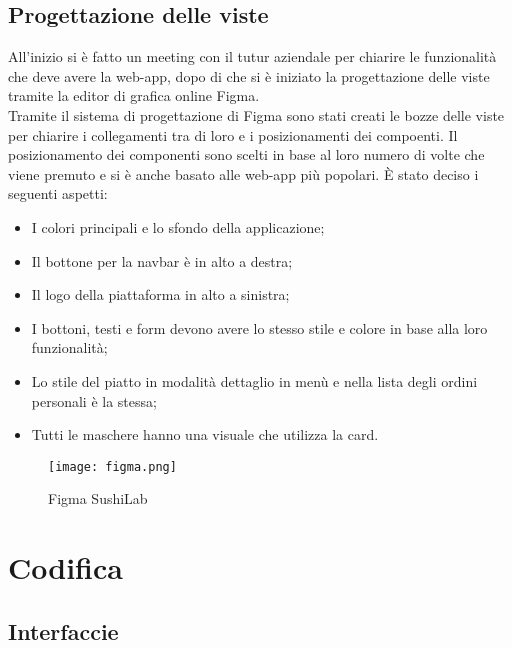 \subsection{Progettazione delle viste}
All'inizio si è fatto un meeting con il tutur aziendale per chiarire le funzionalità che deve avere la web-app, dopo di che si è iniziato la progettazione delle viste tramite la editor di grafica online Figma.\\
Tramite il sistema di progettazione di Figma sono stati creati le bozze delle viste per chiarire i collegamenti tra di loro e i posizionamenti dei compoenti. 
Il posizionamento dei componenti sono scelti in base al loro numero di volte che viene premuto e si è anche basato alle web-app più popolari.
È stato deciso i seguenti aspetti:
\begin{itemize}
    \item I colori principali e lo sfondo della applicazione;
    \item Il bottone per la navbar è in alto a destra;
    \item Il logo della piattaforma in alto a sinistra;
    \item I bottoni, testi e form devono avere lo stesso stile e colore in base alla loro funzionalità;
    \item Lo stile del piatto in modalità dettaglio in menù e nella lista degli ordini personali è la stessa;
    \item Tutti le maschere hanno una visuale che utilizza la card.
\end{itemize}
\begin{figure}[H]
    \centering
    \texttt{[image: figma.png]}
    \caption{Figma SushiLab}
\end{figure}
\pagebreak
\section{Codifica}
\subsection{Interfaccie}
